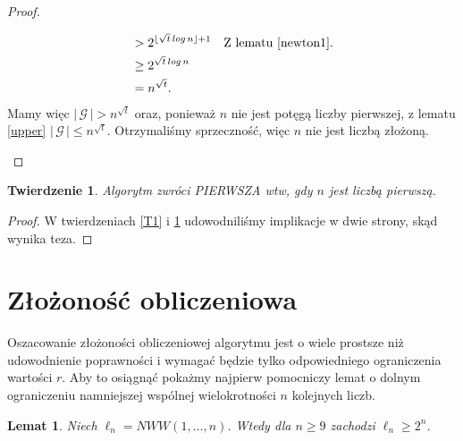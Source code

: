 \documentclass[polish,declaration,shortabstract]{iithesis}
\theoremstyle{definition}
\theoremstyle{remark} \newtheorem{observation}{Obserwacja}
\theoremstyle{plain} \newtheorem{theorem}{Twierdzenie}
\theoremstyle{plain} \newtheorem{lemma}{Lemat}
\theoremstyle{remark} \newtheorem*{remark*}{Uwaga}
\theoremstyle{reminder} \newtheorem*{reminder*}{Przypomnienie}
\begin{document}
\begin{proof}
\begin{enumerate}[label=(\arabic*),leftmargin=.4in]
\begin{align*}
		      	  & > 2^{\lfloor \sqrt{t}\, log \, n \rfloor + 1}                                               &   & \text{Z lematu \ref{newton1}.}                                                                                                                 \\
		      	&\geq 2^{\sqrt{t}\,log \,n} \\
		      	&= n^{\sqrt{t}}.
		      \end{align*}
		      Mamy więc $| \, \mathcal{G} \, | > n ^{\sqrt{t}}$ oraz, ponieważ $n$ nie jest potęgą liczby pierwszej, z lematu \ref{upper} $| \, \mathcal{G} \, | \leq n^{\sqrt{t}}.$ Otrzymaliśmy sprzeczność, więc $n$ nie jest liczbą złożoną.
	\end{enumerate}
\end{proof}
	
\begin{theorem} \label{T2}
	Algorytm zwróci \textit{PIERWSZA} wtw, gdy $n$ jest liczbą pierwszą.
\end{theorem}
	
\begin{proof}
	W twierdzeniach \ref{T1} i \ref{T2} udowodniliśmy implikacje w dwie strony, skąd wynika teza.
\end{proof}
	
\section{Złożoność obliczeniowa}
    
Oszacowanie złożoności obliczeniowej algorytmu jest o wiele prostsze niż udowodnienie poprawności i wymagać będzie tylko odpowiedniego ograniczenia wartości $r$. Aby to osiągnąć pokażmy najpierw pomocniczy lemat o dolnym ograniczeniu namniejszej wspólnej wielokrotności $n$ kolejnych liczb.

\begin{lemma} \label{3.1}
	Niech $\ell_n = NWW(1, \dots, n)$. Wtedy dla $n \geq 9$ zachodzi $\ell_n \geq 2^n$.
\end{lemma}
	
\end{document}
